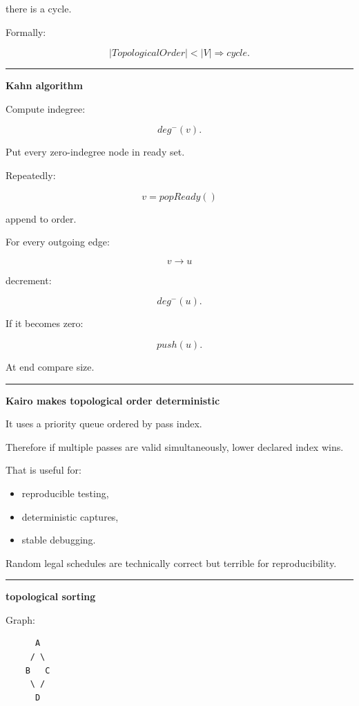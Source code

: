 there is a cycle.

Formally:

\[
\boxed{
|TopologicalOrder|<|V|
\Rightarrow
cycle.
}
\]

\begin{center}\rule{0.5\linewidth}{0.5pt}\end{center}

\textbf{Kahn algorithm}

Compute indegree:

\[
deg^{-}(v).
\]

Put every zero-indegree node in ready set.

Repeatedly:

\[
v=popReady()
\]

append to order.

For every outgoing edge:

\[
v\rightarrow u
\]

decrement:

\[
deg^{-}(u).
\]

If it becomes zero:

\[
push(u).
\]

At end compare size.

\begin{center}\rule{0.5\linewidth}{0.5pt}\end{center}

\textbf{Kairo makes topological order deterministic}

It uses a priority queue ordered by pass index.

Therefore if multiple passes are valid simultaneously, lower declared index wins.

That is useful for:

\begin{itemize}
\tightlist
\item
  reproducible testing,
\item
  deterministic captures,
\item
  stable debugging.
\end{itemize}

Random legal schedules are technically correct but terrible for reproducibility.

\begin{center}\rule{0.5\linewidth}{0.5pt}\end{center}

\textbf{topological sorting}

Graph:

\begin{verbatim}
      A
     / \
    B   C
     \ /
      D
\end{verbatim}

